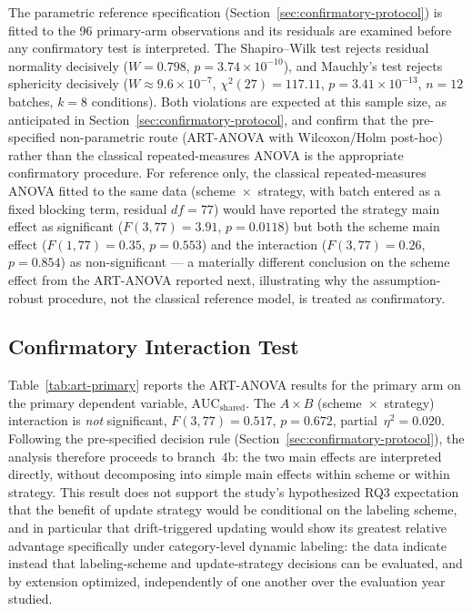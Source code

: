 The parametric reference specification (Section~\ref{sec:confirmatory-protocol}) is fitted to the 96 primary-arm observations and its residuals are examined before any confirmatory test is interpreted. The Shapiro--Wilk test rejects residual normality decisively ($W = 0.798$, $p = 3.74 \times 10^{-10}$), and Mauchly's test rejects sphericity decisively ($W \approx 9.6\times 10^{-7}$, $\chi^2(27) = 117.11$, $p = 3.41\times 10^{-13}$, $n=12$ batches, $k=8$ conditions). Both violations are expected at this sample size, as anticipated in Section~\ref{sec:confirmatory-protocol}, and confirm that the pre-specified non-parametric route (ART-ANOVA with Wilcoxon/Holm post-hoc) rather than the classical repeated-measures ANOVA is the appropriate confirmatory procedure. For reference only, the classical repeated-measures ANOVA fitted to the same data (scheme~$\times$~strategy, with batch entered as a fixed blocking term, residual $df=77$) would have reported the strategy main effect as significant ($F(3,77) = 3.91$, $p = 0.0118$) but both the scheme main effect ($F(1,77)=0.35$, $p=0.553$) and the interaction ($F(3,77)=0.26$, $p=0.854$) as non-significant — a materially different conclusion on the scheme effect from the ART-ANOVA reported next, illustrating why the assumption-robust procedure, not the classical reference model, is treated as confirmatory.

\subsection{Confirmatory Interaction Test}

Table~\ref{tab:art-primary} reports the ART-ANOVA results for the primary arm on the primary dependent variable, $\text{AUC}_{\text{shared}}$. The $A \times B$ (scheme~$\times$~strategy) interaction is \emph{not} significant, $F(3,77) = 0.517$, $p = 0.672$, partial~$\eta^2 = 0.020$. Following the pre-specified decision rule (Section~\ref{sec:confirmatory-protocol}), the analysis therefore proceeds to branch~4b: the two main effects are interpreted directly, without decomposing into simple main effects within scheme or within strategy. This result does not support the study's hypothesized RQ3 expectation that the benefit of update strategy would be conditional on the labeling scheme, and in particular that drift-triggered updating would show its greatest relative advantage specifically under category-level dynamic labeling: the data indicate instead that labeling-scheme and update-strategy decisions can be evaluated, and by extension optimized, independently of one another over the evaluation year studied.

